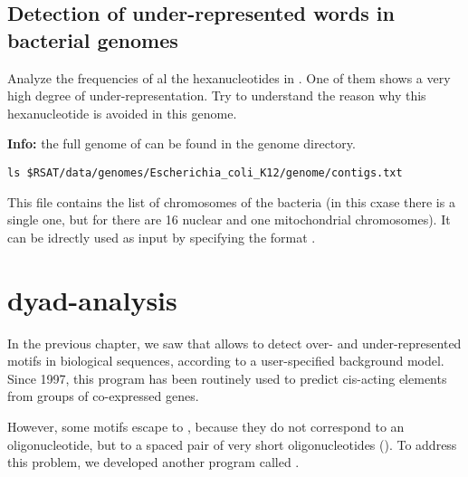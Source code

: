 \subsection{Detection of under-represented words in bacterial genomes}

\begin{exercise}

  Analyze the frequencies of al the hexanucleotides in
  . One of them shows a very high degree of
  under-representation. Try to understand the reason why this
  hexanucleotide is avoided in this genome.

  \textbf{Info:} the full genome of  can be
  found in the \RSAT genome directory.

{\color{Blue} \begin{footnotesize} 
\begin{verbatim}
ls $RSAT/data/genomes/Escherichia_coli_K12/genome/contigs.txt
\end{verbatim} \end{footnotesize}
}

This file contains the list of chromosomes of the bacteria (in this
cxase there is a single one, but for  there are 16 nuclear
and one mitochondrial chromosomes). It can be idrectly used as input
by specifying the format .
\end{exercise}


\section{dyad-analysis}

In the previous chapter, we saw that  allows
to detect over- and under-represented motifs in biological sequences,
according to a user-specified background model. Since 1997, this
program has been routinely used to predict cis-acting elements from
groups of co-expressed genes.

However, some motifs escape to , because they
do not correspond to an oligonucleotide, but to a spaced pair of very
short oligonucleotides (). To address this problem, we
developed another program called .

